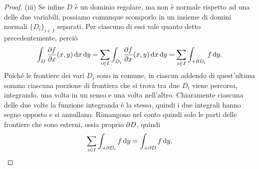 \begin{proof}
	(iii) Se infine $D$ è un dominio regolare, ma non è normale rispetto ad una delle due variabili, possiamo comunque scomporlo in un insieme di domini normali $\{D_i\}_{i\in I}$ separati.
	Per ciascuno di essi vale quanto detto precedentemente, perciò
	\begin{equation}
		\int_D\frac{\partial {f}}{\partial {x}}(x,y)\,\textup{d} x\,\textup{d} y=\sum_{i\in I}\int_{D_i}\frac{\partial {f}}{\partial {x}}(x,y)\,\textup{d} x\,\textup{d} y=\sum_{i\in I}\int_{+\partial D_i}f\,\textup{d} y.
	\end{equation}
	Poich\'e le frontiere dei vari $D_i$ sono in comune, in ciascun addendo di quest'ultima somma ciascuna porzione di frontiera che si trova tra due $D_i$ viene percorsa, integrando, una volta in un senso e una volta nell'altro.
	Chiaramente ciascuna delle due volte la funzione integranda è la stessa, quindi i due integrali hanno segno opposto e si annullano.
	Rimangono nel conto quindi solo le parti delle frontiere che sono esterni, ossia proprio $\partial D$, quindi
	\begin{equation}
		\sum_{i\in I}\int_{+\partial D_i}f\,\textup{d} y=\int_{+\partial D}f\,\textup{d} y.\qedhere
	\end{equation}
\end{proof}

